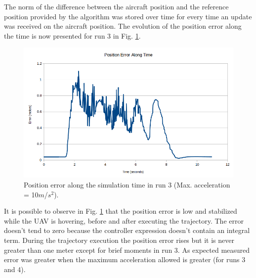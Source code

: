 The norm of the difference between the aircraft position and the reference position provided by the algorithm was stored over time for every time an update was received on the aircraft position. The evolution of the position error along the time is now presented for run 3 in Fig. \ref{alongRun3}.

\begin{figure}[H]
    \centering
    \includegraphics[width=0.9\linewidth]{Figures/07_simulation/Sim/L10along.png}
    \caption{Position error along the simulation time in run 3 (Max. acceleration = 10$m$/$s^2$).}
    \label{alongRun3}
\end{figure}

It is possible to observe in Fig. \ref{alongRun3} that the position error is low and stabilized while the UAV is hovering, before and after executing the trajectory. The error doesn't tend to zero because the controller expression doesn't contain an integral term. During the trajectory execution the position error rises but it is never greater than one meter except for brief moments in run 3. As expected measured error was greater when the maximum acceleration allowed is greater (for runs 3 and 4).


